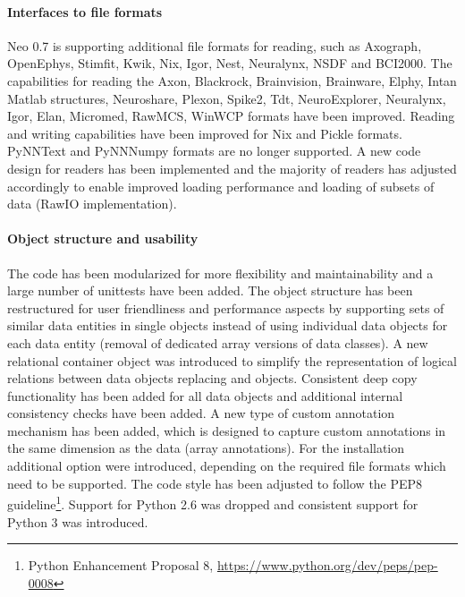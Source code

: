 \paragraph{Interfaces to file formats}
Neo 0.7 is supporting additional file formats for reading, such as Axograph, OpenEphys, Stimfit, Kwik, Nix, Igor, Nest, Neuralynx, NSDF and BCI2000. The capabilities for reading the Axon, Blackrock, Brainvision, Brainware, Elphy, Intan Matlab structures, Neuroshare, Plexon, Spike2, Tdt, NeuroExplorer, Neuralynx, Igor, Elan, Micromed, RawMCS, WinWCP formats have been improved. Reading and writing capabilities have been improved for Nix and Pickle formats. PyNNText and PyNNNumpy formats are no longer supported. A new code design for readers has been implemented and the majority of readers has adjusted accordingly to enable improved loading performance and loading of subsets of data (RawIO implementation). 
\paragraph{Object structure and usability}
The code has been modularized for more flexibility and maintainability and a large number of unittests have been added. The object structure has been restructured for user friendliness and performance aspects by supporting sets of similar data entities in single objects instead of using individual data objects for each data entity (removal of dedicated array versions of data classes). A new relational container object  was introduced to simplify the representation of logical relations between data objects replacing  and  objects. Consistent deep copy functionality has been added for all data objects and additional internal consistency checks have been added. A new type of custom annotation mechanism has been added, which is designed to capture custom annotations in the same dimension as the data (array annotations). For the installation additional option were introduced, depending on the required file formats which need to be supported. The code style has been adjusted to follow the PEP8 guideline\footnote{Python Enhancement Proposal 8, \url{https://www.python.org/dev/peps/pep-0008}}. Support for Python 2.6 was dropped and consistent support for Python 3 was introduced.


